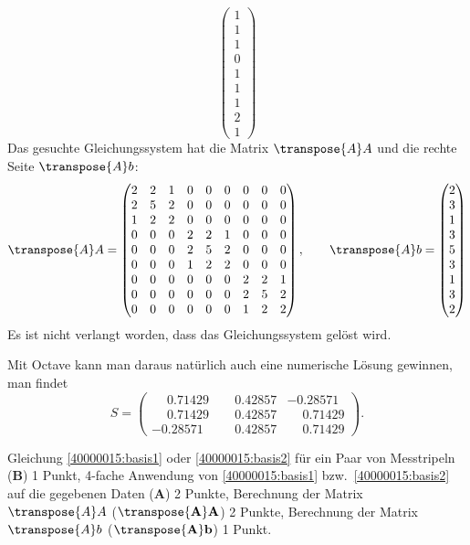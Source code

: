 \begin{loesung}
\[\begin{pmatrix}
1\\1\\1\\
0\\1\\1\\
1\\2\\1
\end{pmatrix}
\]
Das gesuchte Gleichungssystem hat die Matrix $\transpose{A}A$ und die rechte
Seite $\transpose{A}b$:
\[
\transpose{A}A
=
\begin{pmatrix}
2&2&1&0&0&0&0&0&0\\
2&5&2&0&0&0&0&0&0\\
1&2&2&0&0&0&0&0&0\\
%
0&0&0&2&2&1&0&0&0\\
0&0&0&2&5&2&0&0&0\\
0&0&0&1&2&2&0&0&0\\
%
0&0&0&0&0&0&2&2&1\\
0&0&0&0&0&0&2&5&2\\
0&0&0&0&0&0&1&2&2\\
\end{pmatrix}
,\qquad
\transpose{A}b=\begin{pmatrix}2\\3\\1\\3\\5\\3\\1\\3\\2\end{pmatrix}
\]
Es ist nicht verlangt worden, dass das Gleichungssystem gelöst wird.
\end{loesung}

\begin{diskussion}
Mit Octave kann man daraus natürlich auch eine numerische Lösung gewinnen,
man findet
\[
S=\begin{pmatrix}
\phantom{-}0.71429& \phantom{-}0.42857&           -0.28571\\
\phantom{-}0.71429& \phantom{-}0.42857& \phantom{-}0.71429\\
          -0.28571& \phantom{-}0.42857& \phantom{-}0.71429
\end{pmatrix}.
\]
\end{diskussion}

\begin{bewertung}
Gleichung \eqref{40000015:basis1} oder \eqref{40000015:basis2}
für ein Paar von Messtripeln ({\bf B})
1 Punkt,
4-fache Anwendung von \eqref{40000015:basis1} bzw.~\eqref{40000015:basis2} auf die gegebenen Daten ({\bf A})
2 Punkte,
Berechnung der Matrix $\transpose{A}A$ ($\transpose{\textbf{A}}\textbf{A}$) 2 Punkte,
Berechnung der Matrix $\transpose{A}b$ ($\transpose{\textbf{A}}\textbf{b}$) 1 Punkt.

\end{bewertung}


